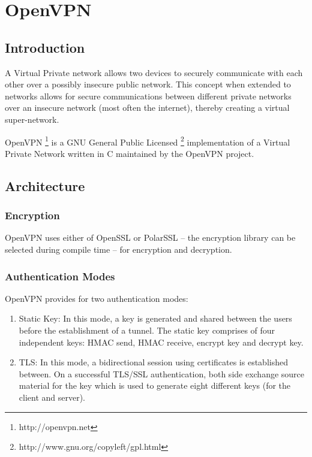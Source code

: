 \documentclass[11pt,oneside]{book}
\newcommand{\mychapter}[2]{
    \setcounter{chapter}{#1}
    \setcounter{section}{0}
    \chapter*{#2}
    \addcontentsline{toc}{chapter}{#2}
}
\begin{document}
\mainmatter

\mychapter{1}{OpenVPN}
\section{Introduction}
A Virtual Private network allows two devices to securely communicate with each other
over a possibly insecure public network. This concept when extended to networks
allows for secure communications between different private networks over an
insecure network (most often the internet), thereby creating a virtual super-network.

OpenVPN \footnote{http://openvpn.net} is a GNU General Public
Licensed \footnote{http://www.gnu.org/copyleft/gpl.html} implementation of a
Virtual Private Network written in C maintained by the OpenVPN project.

\section{Architecture}
\subsection{Encryption}
OpenVPN uses either of OpenSSL or PolarSSL -- the encryption library can be selected during compile
time -- for encryption and decryption.

\subsection{Authentication Modes}
OpenVPN provides for two authentication modes:

\begin{enumerate}
    \item {Static Key}: In this mode, a key is generated and shared between the users before
        the establishment of a tunnel. The static key comprises of four independent keys: HMAC send,
        HMAC receive, encrypt key and decrypt key.
    \item {TLS}: In this mode, a bidirectional session using certificates is established between.
        On a successful TLS/SSL authentication, both side exchange source material for the key
        which is used to generate eight different keys (for the client and server).
\end{enumerate}
\end{document}
